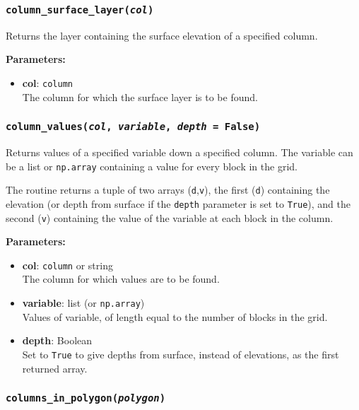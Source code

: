 \subsubsection{\texttt{column\_surface\_layer(\emph{col})}}
\label{sec:column_surface_layer}

Returns the layer containing the surface elevation of a specified column.

\textbf{Parameters:}
\begin{itemize}
\item \textbf{col}: \texttt{column}\\
  The column for which the surface layer is to be found.
\end{itemize}

\subsubsection{\texttt{column\_values(\emph{col}, \emph{variable}, \emph{depth} = False)}}
\label{sec:column_values}

Returns values of a specified variable down a specified column.  The variable can be a list or \texttt{np.array} containing a value for every block in the grid.

The routine returns a tuple of two arrays (\texttt{d},\texttt{v}), the first (\texttt{d}) containing the elevation (or depth from surface if the \texttt{depth} parameter is set to \texttt{True}), and the second (\texttt{v}) containing the value of the variable at each block in the column.

\textbf{Parameters:}
\begin{itemize}
\item \textbf{col}: \texttt{column} or string\\
  The column for which values are to be found.
\item \textbf{variable}: list (or \texttt{np.array})\\
  Values of variable, of length equal to the number of blocks in the grid.
\item \textbf{depth}: Boolean\\
  Set to \texttt{True} to give depths from surface, instead of elevations, as the first returned array.
\end{itemize}

\subsubsection{\texttt{columns\_in\_polygon(\emph{polygon})}}
\label{sec:columns_in_polygon}

